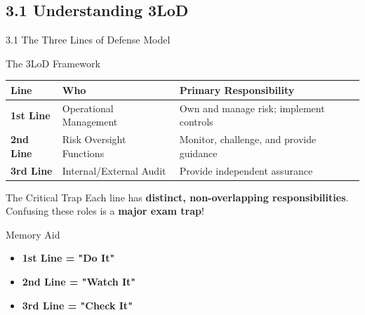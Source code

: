 \documentclass[10pt]{beamer}  %
\begin{document}
	\subsection{3.1 Understanding 3LoD}
	\begin{frame}{3.1 The Three Lines of Defense Model}
		\begin{block}{The 3LoD Framework}
			\begin{tabular}{|p{2.5cm}|p{3.5cm}|p{5cm}|}
				\hline
				\textbf{Line} & \textbf{Who} & \textbf{Primary Responsibility} \\
				\hline
				\textbf{1st Line} & Operational Management & Own and manage risk; implement controls \\
				\hline
				\textbf{2nd Line} & Risk Oversight Functions & Monitor, challenge, and provide guidance \\
				\hline
				\textbf{3rd Line} & Internal/External Audit & Provide independent assurance \\
				\hline
			\end{tabular}
		\end{block}
		
		\begin{alertblock}{The Critical Trap}
			Each line has \textbf{distinct, non-overlapping responsibilities}. Confusing these roles is a \textbf{major exam trap}!
		\end{alertblock}
		
		\begin{exampleblock}{Memory Aid}
			\begin{itemize}
				\item \textbf{1st Line = "Do It"}
				\item \textbf{2nd Line = "Watch It"}
				\item \textbf{3rd Line = "Check It"}
			\end{itemize}
		\end{exampleblock}
	\end{frame}
	
\end{document}
